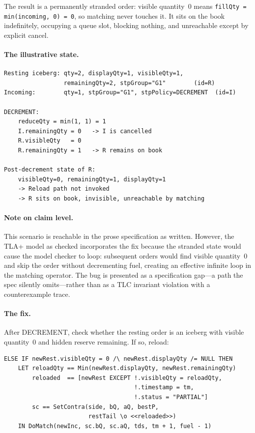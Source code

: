 \documentclass[11pt,a4paper]{article}
\begin{document}
The result is a permanently stranded order: visible quantity~0 means
\texttt{fillQty = min(incoming, 0) = 0}, so matching never touches it.
It sits on the book indefinitely, occupying a queue slot, blocking
nothing, and unreachable except by explicit cancel.

\paragraph{The illustrative state.}

\begin{lstlisting}[language={},basicstyle=\ttfamily\footnotesize,frame=single,xleftmargin=0pt,framexleftmargin=0pt]
Resting iceberg: qty=2, displayQty=1, visibleQty=1,
                 remainingQty=2, stpGroup="G1"        (id=R)
Incoming:        qty=1, stpGroup="G1", stpPolicy=DECREMENT  (id=I)

DECREMENT:
    reduceQty = min(1, 1) = 1
    I.remainingQty = 0   -> I is cancelled
    R.visibleQty   = 0
    R.remainingQty = 1   -> R remains on book

Post-decrement state of R:
    visibleQty=0, remainingQty=1, displayQty=1
    -> Reload path not invoked
    -> R sits on book, invisible, unreachable by matching
\end{lstlisting}

\paragraph{Note on claim level.} This scenario is reachable in the
prose specification as written. However, the TLA+ model as checked
incorporates the fix because the stranded state would cause the model
checker to loop: subsequent orders would find visible quantity~0 and
skip the order without decrementing fuel, creating an effective infinite
loop in the matching operator. The bug is presented as a specification
gap---a path the spec silently omits---rather than as a TLC invariant
violation with a counterexample trace.

\paragraph{The fix.} After DECREMENT, check whether the resting order
is an iceberg with visible quantity~0 and hidden reserve remaining. If
so, reload:

\begin{lstlisting}[language=tlaplus]
ELSE IF newRest.visibleQty = 0 /\ newRest.displayQty /= NULL THEN
    LET reloadQty == Min(newRest.displayQty, newRest.remainingQty)
        reloaded  == [newRest EXCEPT !.visibleQty = reloadQty,
                                     !.timestamp = tm,
                                     !.status = "PARTIAL"]
        sc == SetContra(side, bQ, aQ, bestP,
                        restTail \o <<reloaded>>)
    IN DoMatch(newInc, sc.bQ, sc.aQ, tds, tm + 1, fuel - 1)
\end{lstlisting}
\end{document}
